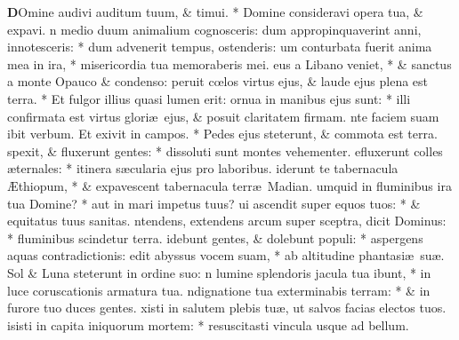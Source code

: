 \documentclass[letter,11pt]{book}
\begin{document}
\begin{multicols}{2}
\lettrine[lines=2]{\bfseries \color{Red} D}{}Omine audivi auditum tuum, \& timui. * Domine consideravi opera tua, \& expavi.
n medio duum animalium cognosceris: dum appropinquaverint anni, innotesceris: * dum advenerit tempus, ostenderis:
um conturbata fuerit anima mea in ira, * misericordia tua memoraberis mei.
eus a Libano veniet, * \& sanctus a monte Opauco \& condenso:
peruit c\oe los virtus ejus, \& laude ejus plena est terra. * Et fulgor illius quasi lumen erit:
ornua in manibus ejus sunt: * illi confirmata est virtus glori\ae \ ejus, \& posuit claritatem firmam.
nte faciem suam ibit verbum. Et exivit in campos. * Pedes ejus steterunt, \& commota est terra.
spexit, \& fluxerunt gentes: * dissoluti sunt montes vehementer.
efluxerunt colles \ae ternales: * itinera s\ae cularia ejus pro laboribus.
iderunt te tabernacula \AE thiopum, * \& expavescent tabernacula terr\ae \ Madian.
umquid in fluminibus ira tua Domine? * aut in mari impetus tuus?
ui ascendit super equos tuos: * \& equitatus tuus sanitas.
ntendens, extendens arcum super sceptra, dicit Dominus: * fluminibus scindetur terra.
idebunt gentes, \& dolebunt populi: * aspergens aquas contradictionis:
edit abyssus vocem suam, * ab altitudine phantasi\ae \ su\ae . Sol \& Luna steterunt in ordine suo:
n lumine splendoris jacula tua ibunt, * in luce coruscationis armatura tua.
ndignatione tua exterminabis terram: * \& in furore tuo duces gentes.
xisti in salutem plebis tu\ae , ut salvos facias electos tuos.
isisti in capita iniquorum mortem: * resuscitasti vincula usque ad bellum.

\end{multicols}
\end{document}
